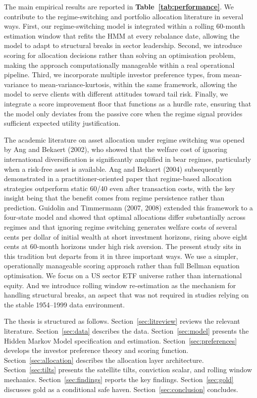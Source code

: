 \documentclass[12pt, a4paper]{article}
\begin{document}
The main empirical results are reported in \textbf{Table~\ref{tab:performance}}. We contribute to the regime-switching and portfolio allocation literature in several ways.
First, our regime-switching model is integrated within a rolling 60-month estimation window that
refits the HMM at every rebalance date, allowing the model to adapt to structural breaks in
sector leadership. Second, we introduce scoring for allocation decisions rather than solving an
optimisation problem, making the approach computationally manageable within a real operational
pipeline. Third, we incorporate multiple investor preference types, from mean-variance to
mean-variance-kurtosis, within the same framework, allowing the model to serve clients with
different attitudes toward tail risk. Finally, we integrate a score improvement floor that
functions as a hurdle rate, ensuring that the model only deviates from the passive core when
the regime signal provides sufficient expected utility justification.

The academic literature on asset allocation under regime switching was opened by
Ang and Bekaert (2002), who showed that the welfare cost of ignoring international
diversification is significantly amplified in bear regimes, particularly when a risk-free asset
is available. Ang and Bekaert (2004) subsequently demonstrated in a practitioner-oriented paper
that regime-based allocation strategies outperform static 60/40 even after transaction costs,
with the key insight being that the benefit comes from regime persistence rather than prediction.
Guidolin and Timmermann (2007, 2008) extended this framework to a four-state model and showed
that optimal allocations differ substantially across regimes and that ignoring regime switching
generates welfare costs of several cents per dollar of initial wealth at short investment
horizons, rising above eight cents at 60-month horizons under high risk aversion. The present
study sits in this tradition but departs from it in three important ways. We use a simpler,
operationally manageable scoring approach rather than full Bellman equation optimisation. We
focus on a US sector ETF universe rather than international equity. And we introduce rolling
window re-estimation as the mechanism for handling structural breaks, an aspect that was not
required in studies relying on the stable 1954--1999 data environment.

The thesis is structured as follows. Section~\ref{sec:litreview} reviews the relevant
literature. Section~\ref{sec:data} describes the data. Section~\ref{sec:model} presents
the Hidden Markov Model specification and estimation. Section~\ref{sec:preferences} develops
the investor preference theory and scoring function. Section~\ref{sec:allocation} describes
the allocation layer architecture. Section~\ref{sec:tilts} presents the satellite tilts,
conviction scalar, and rolling window mechanics. Section~\ref{sec:findings} reports the
key findings. Section~\ref{sec:gold} discusses gold as a conditional safe haven.
Section~\ref{sec:conclusion} concludes.
\end{document}
